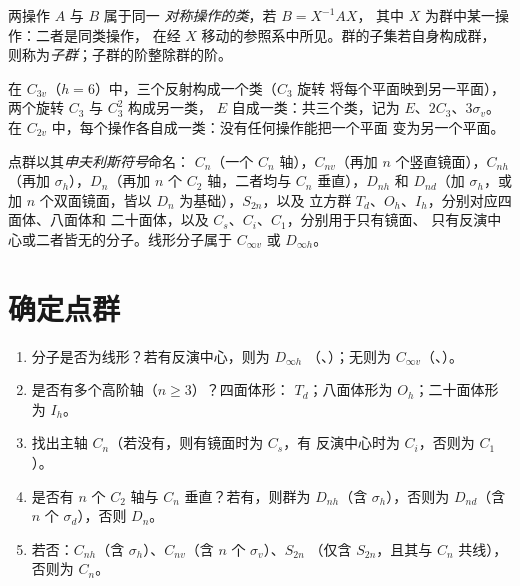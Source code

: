 \begin{definition}[对称操作的类，子群]\label{def:b3:point-groups:class}
两操作 $A$ 与 $B$ 属于同一
\emph{对称操作的类}，若 $B = X^{-1}AX$，
其中 $X$ 为群中某一操作：二者是同类操作，
在经 $X$ 移动的参照系中所见。群的子集若自身构成群，
则称为\emph{子群}；子群的阶整除群的阶。
\end{definition}

\begin{example}[\ce{NH3} 的类]\label{ex:b3:point-groups:classes}
在 $C_{3v}$（$h = 6$）中，三个反射构成一个类（$C_3$ 旋转
将每个平面映到另一平面），两个旋转 $C_3$ 与 $C_3^2$ 构成另一类，
$E$ 自成一类：共三个类，记为 $E$、$2C_3$、$3\sigma_v$。在
$C_{2v}$ 中，每个操作各自成一类：没有任何操作能把一个平面
变为另一个平面。
\end{example}

\begin{definition}[申夫利斯符号]\label{def:b3:point-groups:schoenflies}
点群以其\emph{申夫利斯符号}命名：
$C_n$（一个 $C_n$ 轴），$C_{nv}$（再加 $n$ 个竖直镜面），$C_{nh}$
（再加 $\sigma_h$），$D_n$（再加 $n$ 个 $C_2$ 轴，二者均与 $C_n$ 垂直），$D_{nh}$
和 $D_{nd}$（加 $\sigma_h$，或加 $n$ 个双面镜面，皆以 $D_n$ 为基础），$S_{2n}$，以及
立方群 $T_d$、$O_h$、$I_h$，分别对应四面体、八面体和
二十面体，以及 $C_s$、$C_i$、$C_1$，分别用于只有镜面、
只有反演中心或二者皆无的分子。线形分子属于
$C_{\infty v}$ 或 $D_{\infty h}$。
\end{definition}

\section{确定点群}

\begin{method}[确定分子的点群]\label{met:b3:point-groups:assign}
\begin{enumerate}
  \item 分子是否为线形？若有反演中心，则为 $D_{\infty h}$
        （、）；无则为 $C_{\infty v}$（、）。
  \item 是否有多个高阶轴（$n \ge 3$）？四面体形：
        $T_d$；八面体形为 $O_h$；二十面体形为 $I_h$。
  \item 找出主轴 $C_n$（若没有，则有镜面时为 $C_s$，有
        反演中心时为 $C_i$，否则为 $C_1$）。
  \item 是否有 $n$ 个 $C_2$ 轴与 $C_n$ 垂直？若有，则群为
        $D_{nh}$（含 $\sigma_h$），否则为 $D_{nd}$（含 $n$ 个 $\sigma_d$），否则
        $D_n$。
  \item 若否：$C_{nh}$（含 $\sigma_h$）、$C_{nv}$（含 $n$ 个 $\sigma_v$）、$S_{2n}$
        （仅含 $S_{2n}$，且其与 $C_n$ 共线），否则为 $C_n$。
\end{enumerate}
\end{method}

